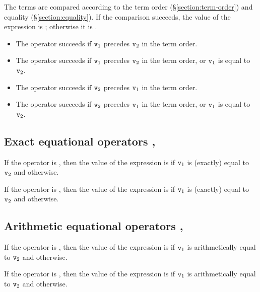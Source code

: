 The terms are compared according to the term order (\S\ref{section:term-order})
and equality (\S\ref{section:equality}).  If the comparison succeeds, the value
of the expression is ; otherwise it is .
\begin{itemize}
\item The operator \T{<} succeeds if ${\tt{\sl v}}_1$ precedes ${\tt{\sl v}}_2$ in the term
order.
\item The operator \T{=<} succeeds if ${\tt{\sl v}}_1$ precedes ${\tt{\sl v}}_2$ in the term
order, or ${\tt{\sl v}}_1$ is equal to ${\tt{\sl v}}_2$.
\item The operator \T{>} succeeds if ${\tt{\sl v}}_2$ precedes ${\tt{\sl v}}_1$ in the term
order.
\item The operator \T{>=} succeeds if ${\tt{\sl v}}_2$ precedes ${\tt{\sl v}}_1$ in the term
order, or ${\tt{\sl v}}_1$ is equal to ${\tt{\sl v}}_2$.
\end{itemize}

\subsection{Exact equational operators \T{=:=}, \T{=/=}}

\label{section:exactequationalops}

If the operator is \T{=:=}, then the value of the expression is  if
${\tt{\sl v}}_1$ is (exactly) equal to ${\tt{\sl v}}_2$ and  otherwise.

If the operator is \T{=/=}, then the value of the expression is  if
${\tt{\sl v}}_1$ is (exactly) equal to ${\tt{\sl v}}_2$ and  otherwise.

\subsection{Arithmetic equational operators \T{==}, \T{/=}}

\label{section:coercingequationalops}

If the operator is \T{==}, then the value of the expression is  if
${\tt{\sl v}}_1$ is arithmetically equal to ${\tt{\sl v}}_2$ and  otherwise.

If the operator is \T{/=}, then the value of the expression is  if
${\tt{\sl v}}_1$ is arithmetically equal to ${\tt{\sl v}}_2$ and  otherwise.

